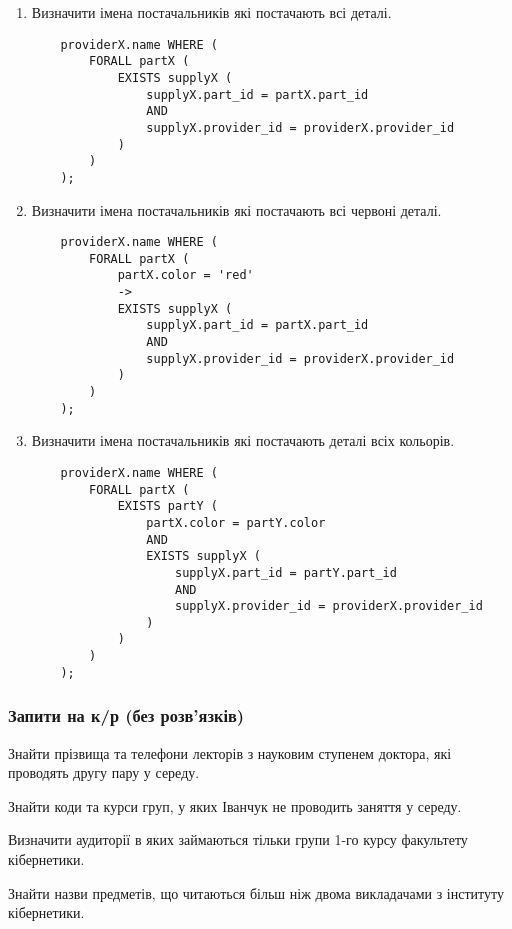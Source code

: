 \begin{enumerate}
    \item Визначити імена постачальників які постачають всі деталі.
    \begin{verbatim}
    providerX.name WHERE (
        FORALL partX (
            EXISTS supplyX (
                supplyX.part_id = partX.part_id 
                AND
                supplyX.provider_id = providerX.provider_id
            )
        )
    );
    \end{verbatim}
    
    \item Визначити імена постачальників які постачають всі червоні деталі.
    \begin{verbatim}
    providerX.name WHERE (
        FORALL partX (
            partX.color = 'red' 
            -> 
            EXISTS supplyX (
                supplyX.part_id = partX.part_id 
                AND 
                supplyX.provider_id = providerX.provider_id
            )
        )
    );
    \end{verbatim}
    
    \item Визначити імена постачальників які постачають деталі всіх кольорів. 
    \begin{verbatim}
    providerX.name WHERE (
        FORALL partX (
            EXISTS partY (
                partX.color = partY.color 
                AND 
                EXISTS supplyX (
                    supplyX.part_id = partY.part_id 
                    AND 
                    supplyX.provider_id = providerX.provider_id
                )
            )
        )
    );
    \end{verbatim}
    
\end{enumerate}

\subsubsection{Запити на к/р (без розв'язків)}

\begin{card}
    \item Знайти прізвища та телефони лекторів з науковим ступенем доктора, які проводять другу пару у середу. 
    \item Знайти коди та курси груп, у яких Іванчук не проводить заняття у середу.
    \item Визначити аудиторії в яких займаються тільки групи 1-го курсу факультету кібернетики.
    \item Знайти назви предметів, що читаються більш ніж двома викладачами з інституту кібернетики.
\end{card}

